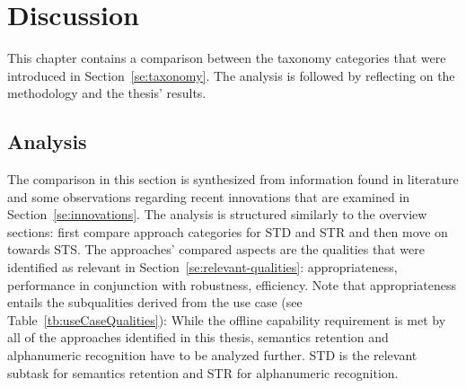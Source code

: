 \chapter{Discussion}\label{ch:discussion}
This chapter contains a comparison between the taxonomy categories that were introduced in
Section~\ref{se:taxonomy}.
The analysis is followed by reflecting on the methodology and the thesis' results.

\section{Analysis}\label{se:analysis}
The comparison in this section is synthesized from information found in literature and
some observations regarding recent innovations that are examined in Section~\ref{se:innovations}.
The analysis is structured similarly to the overview sections: first compare approach categories
for \ac{STD} and \ac{STR} and then move on towards \ac{STS}.
The approaches' compared aspects are the qualities that were identified as relevant in
Section~\ref{se:relevant-qualities}: appropriateness, performance in conjunction with robustness,
efficiency.
Note that appropriateness entails the subqualities derived from the use
case (see Table~\ref{tb:useCaseQualities}):
While the offline capability requirement is met by all of the approaches identified in this
thesis, semantics retention and alphanumeric recognition have to be analyzed further.
\ac{STD} is the relevant subtask for semantics retention and \ac{STR} for alphanumeric recognition.

